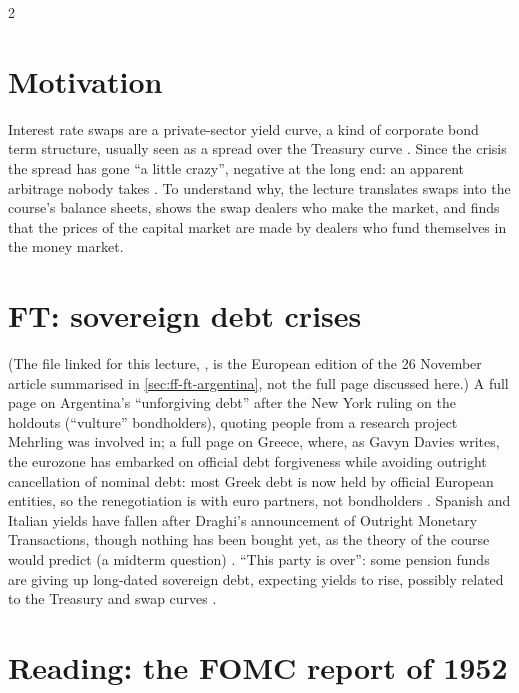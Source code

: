 \begin{paracol}{2}
\section*{Motivation}
Interest rate swaps are a private-sector yield curve, a kind of corporate bond term structure, usually seen as a spread over the Treasury curve
. Since the crisis the spread has gone ``a little crazy'', negative at the long end: an apparent arbitrage nobody takes
. To understand why, the lecture translates swaps into the course's balance sheets, shows the
swap dealers who make the market, and finds that the prices of the capital market are made by dealers who fund themselves in the money market.

\section{FT: sovereign debt crises}\label{sec:irs-ft}

\begin{casestudy}
(The file linked for this lecture, , is the European edition of the 26 November article summarised in \cref{sec:ff-ft-argentina}, not the full page discussed here.)
A full page on Argentina's ``unforgiving debt'' after the New York ruling on the holdouts (``vulture'' bondholders), quoting people from a research project Mehrling
was involved in; a full page on Greece, where, as Gavyn Davies writes, the eurozone has embarked on official debt forgiveness while avoiding outright
cancellation of nominal debt: most Greek debt is now held by official European entities, so the renegotiation is with euro partners, not bondholders
. Spanish and Italian yields have fallen after Draghi's announcement of Outright
Monetary Transactions, though nothing has been bought yet, as the theory of the course would predict (a midterm question) .
``This party is over'': some pension funds are giving up long-dated sovereign debt, expecting yields to rise, possibly related to the Treasury and swap curves
.
\end{casestudy}

\section{Reading: the FOMC report of 1952}\label{sec:irs-fomc}


\end{paracol}
